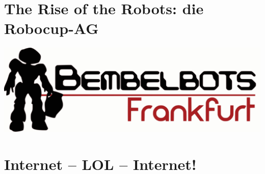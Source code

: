 \documentclass[a4paper,12pt]{scrartcl}
\newcommand{\spaltenanfang}{\begin{multicols}{2}}
\newcommand{\spaltenende}{\end{multicols}}
\begin{document}



\section{The Rise of the Robots: die Robocup-AG}

\spaltenanfang

\spaltenende
\vspace{4mm}
\begin{center}
\includegraphics[scale=0.25]{bitmaps/Bembelbots}
\end{center}
\newpage


\section{Internet – LOL – Internet!}
\end{document}
